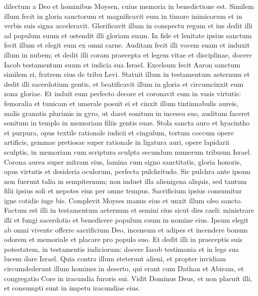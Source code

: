 \begin{biblechapter}  
\verse dilectum a Deo et hominibus Moysen, cuius memoria in benedictione est. 
\verse Similem illum fecit in gloria sanctorum et magnificavit eum in timore inimicorum et in verbis suis signa acceleravit. 
\verse Glorificavit illum in conspectu regum et ius dedit illi ad populum suum et ostendit illi gloriam suam. 
\verse In fide et lenitate ipsius sanctum fecit illum et elegit eum ex omni carne. 
\verse Auditam fecit illi vocem suam et induxit illum in nubem; 
\verse et dedit illi coram praecepta et legem vitae et disciplinae, docere Iacob testamentum suum et iudicia sua Israel. 
\verse Excelsum fecit Aaron sanctum similem ei, fratrem eius de tribu Levi. 
\verse Statuit illum in testamentum aeternum et dedit illi sacerdotium gentis, et beatificavit illum in gloria 
\verse et circumcinxit eum zona gloriae. Et induit eum perfecto decore et coronavit eum in vasis virtutis: 
\verse femoralia et tunicam et umerale posuit ei et cinxit illum tintinnabulis aureis, malis granatis plurimis in gyro, 
\verse ut daret sonitum in incessu suo, auditum faceret sonitum in templo in memoriam filiis gentis suae. 
\verse Stola sancta auro et hyacintho et purpura, opus textile rationale iudicii et cingulum, 
\verse tortum coccum opere artificis, gemmae pretiosae super rationale in ligatura auri, opere lapidarii sculptis, in memoriam cum scriptura sculpta secundum numerum tribuum Israel. 
\verse Corona aurea super mitram eius, lamina cum signo sanctitatis, gloria honoris, opus virtutis et desideria oculorum, perfecta pulchritudo. 
\verse Sic pulchra ante ipsum non fuerunt talia in sempiternum; 
\verse non induet illa alienigena aliquis, sed tantum filii ipsius soli et nepotes eius per omne tempus. 
\verse Sacrificium ipsius consumitur igne cotidie iuge bis. 
\verse Complevit Moyses manus eius et unxit illum oleo sancto. 
\verse Factum est illi in testamentum aeternum et semini eius sicut dies caeli: ministrare illi et fungi sacerdotio et benedicere populum suum in nomine eius. 
\verse Ipsum elegit ab omni vivente offerre sacrificium Deo, incensum et adipes et incendere bonum odorem et memoriale et placare pro populo suo. 
\verse Et dedit illi in praeceptis suis potestatem, in testamentis iudiciorum: docere Iacob testimonia et in lege sua lucem dare Israel. 
\verse Quia contra illum steterunt alieni, et propter invidiam circumdederunt illum homines in deserto, qui erant cum Dathan et Abiram, et congregatio Core in iracundia furoris sui. 
\verse Vidit Dominus Deus, et non placuit illi, et consumpti sunt in impetu iracundiae eius. 

\end{biblechapter}
